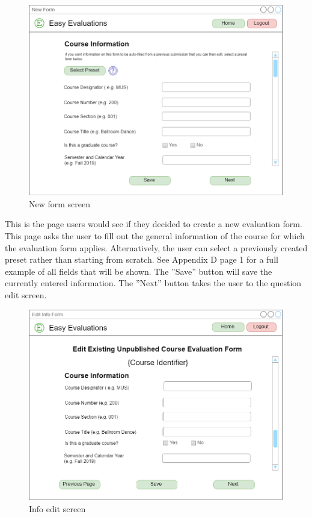 \documentclass{article}
\begin{document}
\newpage

\begin{center}
\begin{figure}[H]
    \centering
    \caption{New form screen}
    \includegraphics[width=6.5in]{images/create_screen.png}
\end{figure}
\end{center}

This is the page users would see if they decided to create a new evaluation form. This page asks the user to fill out the general information of the course for which the evaluation form applies. Alternatively, the user can select a previously created preset rather than starting from scratch. See Appendix D page 1 for a full example of all fields that will be shown.  The ''Save'' button will save the currently entered information. The ''Next'' button takes the user to the question edit screen.

\newpage

\begin{center}
\begin{figure}[H]
    \centering
    \caption{Info edit screen}
    \includegraphics[width=6.5in]{images/edit_info_screen.png}
\end{figure}
\end{center}
\end{document}
